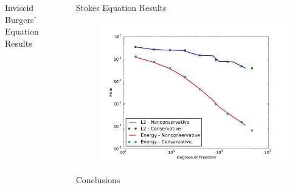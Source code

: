 \documentclass[final]{beamer}
\newlength{\sepwid}
\newlength{\onecolwid}
\begin{document}
\begin{frame}[t]
\begin{columns}[t]
\begin{column}{\onecolwid}
\begin{block}{Inviscid Burgers' Equation Results}
\end{block}


\end{column} %

\begin{column}{\sepwid}\end{column} %

\begin{column}{\onecolwid} %

\begin{block}{Stokes Equation Results}

\vspace{-1ex}
\begin{figure}
\includegraphics[width=0.8\linewidth]{figs/Erickson/modifiedError.pdf}
\end{figure}

\end{block}


\begin{block}{Conclusions}


\end{block}
\end{column}
\end{columns}
\end{frame}
\end{document}
